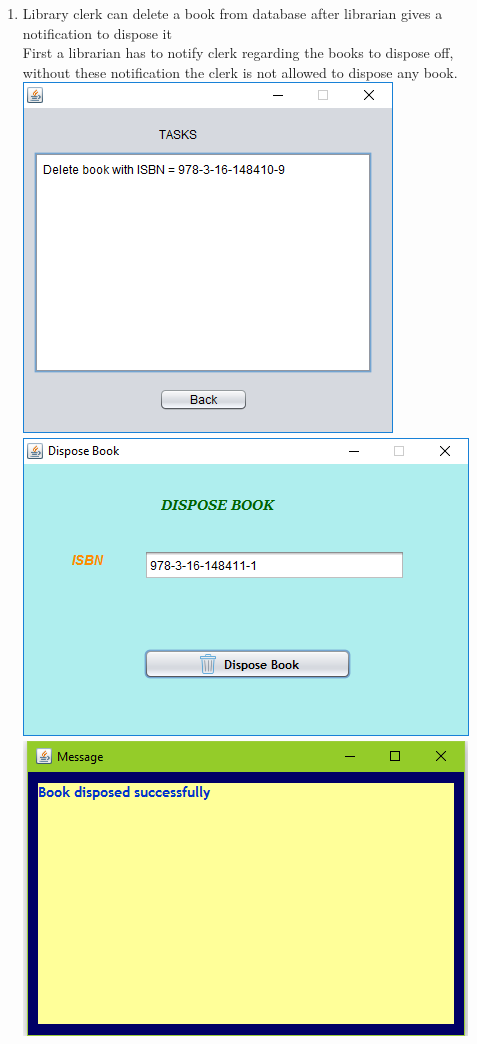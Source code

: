 \documentclass{article}
\begin{document}
\begin{enumerate}
\begin{itemize}
\end{itemize}


\item Library clerk can delete a book from database after librarian  gives a notification to dispose it\\
First a librarian has to notify clerk regarding the books to dispose off, without these notification the clerk is not allowed to dispose any book.\\

\includegraphics[scale = 0.8]{images/ClerkLogin/Actions/DeleteBook/ClerkNotif.PNG}\\
\includegraphics[scale = 0.8]{images/ClerkLogin/Actions/DeleteBook/DisposeWindow.PNG}\\
\includegraphics[scale = 0.8]{images/BookDisposed.PNG}\\


\end{enumerate}
\end{document}
